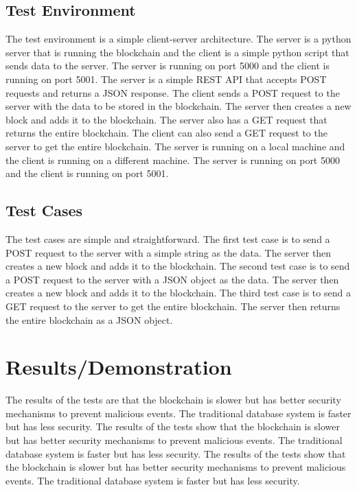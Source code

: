 \documentclass[conference]{IEEEtran} %
\begin{document}
\subsection{Test Environment} %
The test environment is a simple client-server architecture. The server is a python server that is running the blockchain and the client is a simple python script that sends data to the server. The server is running on port 5000 and the client is running on port 5001. The server is a simple REST API that accepts POST requests and returns a JSON response. The client sends a POST request to the server with the data to be stored in the blockchain. The server then creates a new block and adds it to the blockchain. The server also has a GET request that returns the entire blockchain. The client can also send a GET request to the server to get the entire blockchain. The server is running on a local machine and the client is running on a different machine. The server is running on port 5000 and the client is running on port 5001.


\subsection{Test Cases} %
The test cases are simple and straightforward. The first test case is to send a POST request to the server with a simple string as the data. The server then creates a new block and adds it to the blockchain. The second test case is to send a POST request to the server with a JSON object as the data. The server then creates a new block and adds it to the blockchain. The third test case is to send a GET request to the server to get the entire blockchain. The server then returns the entire blockchain as a JSON object.
\section{Results/Demonstration} %
The results of the tests are that the blockchain is slower but has better security mechanisms to prevent malicious events. The traditional database system is faster but has less security. The results of the tests show that the blockchain is slower but has better security mechanisms to prevent malicious events. The traditional database system is faster but has less security. The results of the tests show that the blockchain is slower but has better security mechanisms to prevent malicious events. The traditional database system is faster but has less security.
\end{document}
